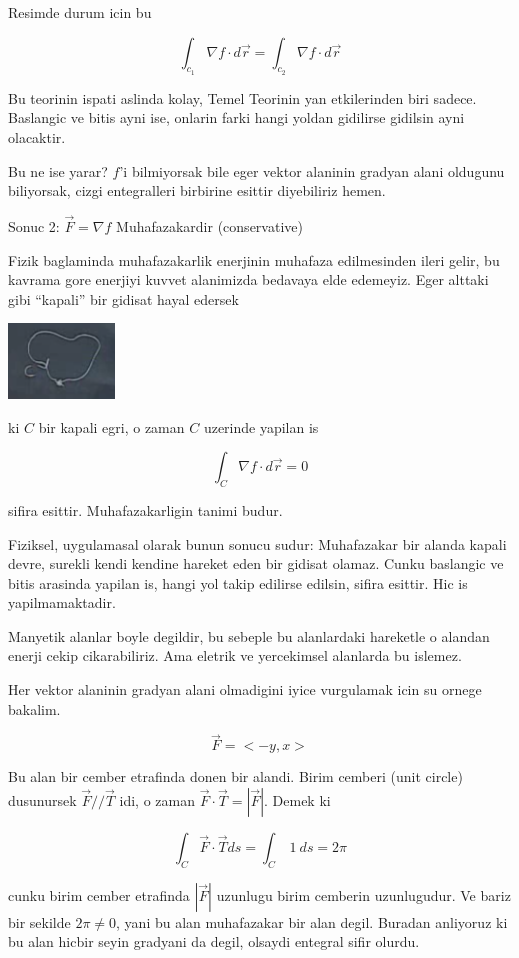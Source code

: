 \documentclass[12pt,fleqn]{article}\usepackage{../common}
\begin{document}
Resimde durum icin bu

\[ \int_{c_1}\nabla f \cdot d\vec{r} =  \int_{c_2}\nabla f \cdot d\vec{r} \]

Bu teorinin ispati aslinda kolay, Temel Teorinin yan etkilerinden biri
sadece. Baslangic ve bitis ayni ise, onlarin farki hangi yoldan gidilirse
gidilsin ayni olacaktir. 

Bu ne ise yarar? $f$'i bilmiyorsak bile eger vektor alaninin gradyan alani
oldugunu biliyorsak, cizgi entegralleri birbirine esittir diyebiliriz hemen. 

Sonuc 2: $\vec{F} = \nabla f$ Muhafazakardir (conservative)

Fizik baglaminda muhafazakarlik enerjinin muhafaza edilmesinden ileri
gelir, bu kavrama gore enerjiyi kuvvet alanimizda bedavaya elde
edemeyiz. Eger alttaki gibi ``kapali'' bir gidisat hayal edersek

\includegraphics[height=2cm]{20_8.png}

ki $C$ bir kapali egri, o zaman $C$ uzerinde yapilan is

\[ \int_{C}\nabla f \cdot d\vec{r} = 0\]

sifira esittir. Muhafazakarligin tanimi budur. 

Fiziksel, uygulamasal olarak bunun sonucu sudur: Muhafazakar bir alanda
kapali devre, surekli kendi kendine hareket eden bir gidisat olamaz. Cunku
baslangic ve bitis arasinda yapilan is, hangi yol takip edilirse edilsin,
sifira esittir. Hic is yapilmamaktadir. 

Manyetik alanlar boyle degildir, bu sebeple bu alanlardaki hareketle o
alandan enerji cekip cikarabiliriz. Ama eletrik ve yercekimsel alanlarda bu
islemez. 

Her vektor alaninin gradyan alani olmadigini iyice vurgulamak icin su
ornege bakalim. 

\[ \vec{F} = <-y,x> \]

Bu alan bir cember etrafinda donen bir alandi. Birim cemberi (unit circle)
dusunursek $\vec{F} // \vec{T}$ idi, o zaman $\vec{F}\cdot\vec{T} =
|\vec{F}|$. Demek ki

\[ \int_C \vec{F}\cdot\vec{T} ds = \int_C \ 1 \ ds = 2\pi \]

cunku birim cember etrafinda $|\vec{F}|$ uzunlugu birim cemberin
uzunlugudur. Ve bariz bir sekilde $2\pi \ne 0$, yani bu alan muhafazakar
bir alan degil. Buradan anliyoruz ki bu alan hicbir seyin gradyani da
degil, olsaydi entegral sifir olurdu. 
\end{document}
